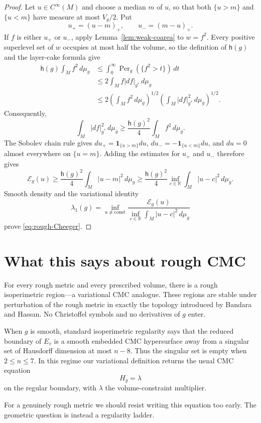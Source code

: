 \documentclass[11pt]{amsart}
\theoremstyle{definition}
\theoremstyle{remark}
\newcommand{\Per}{\operatorname{Per}}
\newcommand{\dmu}[1]{\,d\mu_{#1}}
\newcommand{\one}{\mathbf 1}
\newcommand{\R}{\mathbb R}
\newcommand{\cE}{\mathcal E}
\newcommand{\hch}{\mathsf h}
\begin{document}
\begin{proof}
Let $u\in C^\infty(M)$ and choose a median $m$ of $u$, so that both
$\{u>m\}$ and $\{u<m\}$ have measure at most $V_g/2$.  Put
\[
 u_+=(u-m)_+,
 \qquad
 u_-=(m-u)_+.
\]
If $f$ is either $u_+$ or $u_-$, apply
Lemma~\ref{lem:weak-coarea} to $w=f^2$.  Every positive superlevel set of
$w$ occupies at most half the volume, so the definition of $\hch(g)$ and
the layer-cake formula give
\begin{align*}
 \hch(g)\int_M f^2\dmu g
 &\leq\int_0^\infty\Per_g(\{f^2>t\})\,dt\\
 &\leq2\int_M f|df|_{g^*}\dmu g\\
 &\leq2\left(\int_M f^2\dmu g\right)^{1/2}
       \left(\int_M|df|_{g^*}^2\dmu g\right)^{1/2}.
\end{align*}
Consequently,
\[
 \int_M|df|_{g^*}^2\dmu g
 \geq\frac{\hch(g)^2}{4}\int_Mf^2\dmu g.
\]
The Sobolev chain rule gives
$du_+=\one_{\{u>m\}}du$, $du_-=-\one_{\{u<m\}}du$, and $du=0$ almost
everywhere on $\{u=m\}$.  Adding the estimates for $u_+$ and $u_-$ therefore
gives
\[
 \cE_g(u)\geq\frac{\hch(g)^2}{4}
 \int_M|u-m|^2\dmu g
 \geq\frac{\hch(g)^2}{4}
 \inf_{c\in\R}\int_M|u-c|^2\dmu g.
\]
Smooth density and the variational identity
\[
 \lambda_1(g)=\inf_{u\not\equiv\mathrm{const}}
 \frac{\cE_g(u)}{\displaystyle
  \inf_{c\in\R}\int_M|u-c|^2\dmu g}
\]
prove \eqref{eq:rough-Cheeger}.
\end{proof}

\section{What this says about rough CMC}

For every rough metric and every prescribed
volume, there is a rough isoperimetric region---a variational CMC analogue.
These regions are stable
under perturbation of the rough metric in exactly the topology introduced by
Bandara and Hassan.  No Christoffel symbols and no derivatives of $g$ enter.

When $g$ is smooth, standard isoperimetric regularity
\cite{Maggi2012} says that the reduced boundary of $E_v$ is a smooth embedded
CMC hypersurface away from a singular set of Hausdorff dimension at most
$n-8$.  Thus the singular set is empty when
$2\leq n\leq7$.  In this regime our variational definition returns the usual
CMC equation
\[
 H_g=\lambda
\]
on the regular boundary, with $\lambda$ the volume-constraint multiplier.

For a genuinely rough metric we should resist writing this equation too
early.  The geometric question is instead a regularity ladder.
\end{document}
